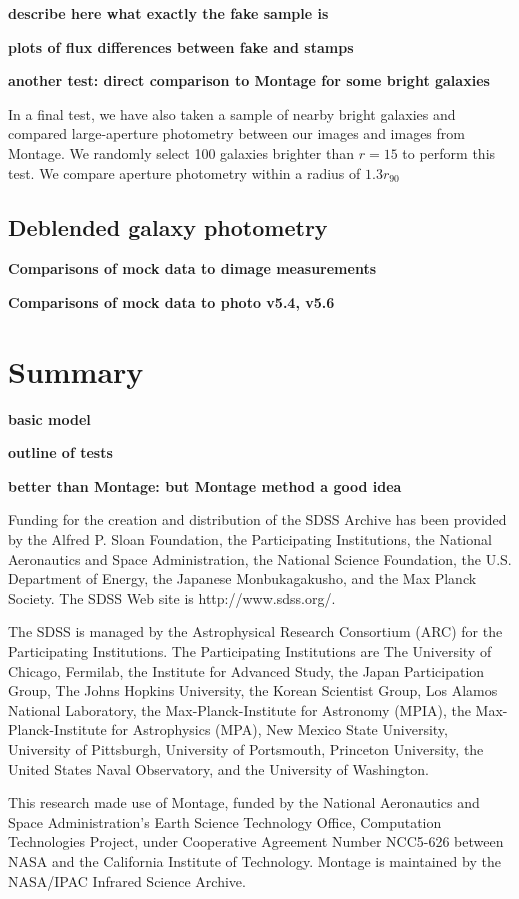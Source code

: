 \documentclass[10pt,preprint]{aastex}
\begin{document}
{\bf describe here what exactly the fake sample is}

{\bf plots of flux differences between fake and stamps}

{\bf another test: direct comparison to Montage for some bright
galaxies}

In a final test, we have also taken a sample of nearby bright galaxies
and compared large-aperture photometry between our images and images
from Montage. We randomly select 100 galaxies brighter than $r=15$ to
perform this test. We compare aperture photometry within a radius of
$1.3 r_{90}$

\subsection{Deblended galaxy photometry}
\label{sec:deblendgal}

{\bf Comparisons of mock data to dimage measurements}

{\bf Comparisons of mock data to photo v5.4, v5.6}

\section{ Summary}

{\bf basic model}

{\bf outline of tests}

{\bf better than Montage: but Montage method a good idea}

\acknowledgments

Funding for the creation and distribution of the SDSS Archive has been
provided by the Alfred P. Sloan Foundation, the Participating
Institutions, the National Aeronautics and Space Administration, the
National Science Foundation, the U.S. Department of Energy, the
Japanese Monbukagakusho, and the Max Planck Society. The SDSS Web site
is http://www.sdss.org/.

The SDSS is managed by the Astrophysical Research Consortium (ARC) for
the Participating Institutions. The Participating Institutions are The
University of Chicago, Fermilab, the Institute for Advanced Study, the
Japan Participation Group, The Johns Hopkins University, the Korean
Scientist Group, Los Alamos National Laboratory, the
Max-Planck-Institute for Astronomy (MPIA), the Max-Planck-Institute
for Astrophysics (MPA), New Mexico State University, University of
Pittsburgh, University of Portsmouth, Princeton University, the United
States Naval Observatory, and the University of Washington.

This research made use of Montage, funded by the National Aeronautics and
Space Administration's Earth Science Technology Office, Computation
Technologies Project, under Cooperative Agreement Number NCC5-626 between
NASA and the California Institute of Technology. Montage is maintained by
the NASA/IPAC Infrared Science Archive.




\newpage


%
\end{document}
